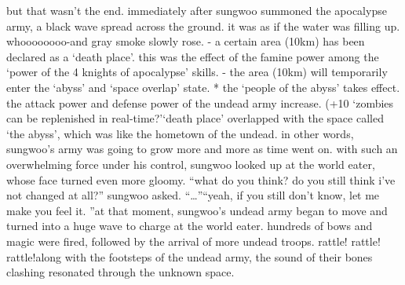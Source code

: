 but that wasn’t the end.
 immediately after sungwoo summoned the apocalypse army, a black wave spread across the ground.
 it was as if the water was filling up.
whoooooooo-and gray smoke slowly rose.
- a certain area (10km) has been declared as a ‘death place’.
this was the effect of the famine power among the ‘power of the 4 knights of apocalypse’ skills.
- the area (10km) will temporarily enter the ‘abyss’ and ‘space overlap’ state.
* the ‘people of the abyss’ takes effect.
 the attack power and defense power of the undead army increase.
 (+10%
‘zombies can be replenished in real-time?’‘death place’ overlapped with the space called ‘the abyss’, which was like the hometown of the undead.
 in other words, sungwoo’s army was going to grow more and more as time went on.
with such an overwhelming force under his control, sungwoo looked up at the world eater, whose face turned even more gloomy.
“what do you think? do you still think i’ve not changed at all?” sungwoo asked.
“…”“yeah, if you still don’t know, let me make you feel it.
”at that moment, sungwoo’s undead army began to move and turned into a huge wave to charge at the world eater.
 hundreds of bows and magic were fired, followed by the arrival of more undead troops.
rattle! rattle! rattle!along with the footsteps of the undead army, the sound of their bones clashing resonated through the unknown space.

